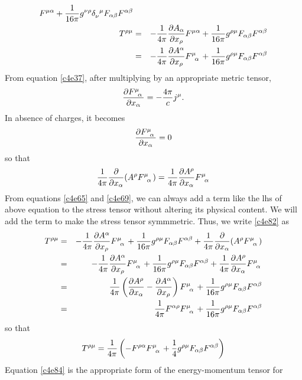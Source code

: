 \begin{enumerate}
\begin{eqnarray}
F^{\mu\alpha} +
\frac{1}{16\pi}g^{\nu\rho}\tensor{\delta}{_\nu^\mu} F_{\alpha\beta}
F^{\alpha\beta} \nonumber \\
T^{\rho\mu} &=& -\frac{1}{4\pi}\pdt{A_\alpha}{x_\rho}F^{\mu\alpha} + 
\frac{1}{16\pi}\tensor{g}{^\rho^\mu} F_{\alpha\beta}F^{\alpha\beta} \nonumber \\
 &=& -\frac{1}{4\pi}\pdt{A^\alpha}{x_\rho}\tensor{F}{^\mu_\alpha} + 
\frac{1}{16\pi}\tensor{g}{^\rho^\mu} F_{\alpha\beta}F^{\alpha\beta} 
\label{c4e82}
\end{eqnarray}
From equation \eqref{c4e37}, after multiplying by an appropriate metric tensor,
\[
\pdt{\tensor{F}{^\mu_\alpha}}{x_\alpha} = -\frac{4\pi}{c}j^\mu.
\]
In absence of charges, it becomes
\[
\pdt{\tensor{F}{^\mu_\alpha}}{x_\alpha} = 0
\]
so that
\begin{equation}\label{c4e83}
\frac{1}{4\pi}\frac{\partial}{\partial x_\alpha}(A^\rho\tensor{F}{^\mu_\alpha}) 
= \frac{1}{4\pi}\pdt{A^\rho}{x_\alpha}\tensor{F}{^\mu_\alpha}
\end{equation}
From equations \eqref{c4e65} and \eqref{c4e69}, we can always add a term like 
the lhs of above equation to the stress tensor without altering its physical 
content. We will add the term to make the stress tensor symmmetric. Thus, we 
write \eqref{c4e82} as
\begin{eqnarray*}
T^{\rho\mu} &=& -\frac{1}{4\pi}\pdt{A^\alpha}{x_\rho}\tensor{F}{^\mu_\alpha} + 
\frac{1}{16\pi}\tensor{g}{^\rho^\mu} F_{\alpha\beta}F^{\alpha\beta} +
\frac{1}{4\pi}\frac{\partial}{\partial x_\alpha}(A^\rho
\tensor{F}{^\mu_\alpha}) \\
 &=& -\frac{1}{4\pi}\pdt{A^\alpha}{x_\rho}\tensor{F}{^\mu_\alpha} + 
\frac{1}{16\pi}\tensor{g}{^\rho^\mu} F_{\alpha\beta}F^{\alpha\beta} +
\frac{1}{4\pi}\pdt{A^\rho}{x_\alpha}\tensor{F}{^\mu_\alpha} \\
 &=& \frac{1}{4\pi}\left(\pdt{A^\rho}{x_\alpha} - \pdt{A^\alpha}{x_\rho}\right)
 \tensor{F}{^\mu_\alpha} + 
 \frac{1}{16\pi}\tensor{g}{^\rho^\mu} F_{\alpha\beta}F^{\alpha\beta} \\
 &=& \frac{1}{4\pi}F^{\alpha\rho}\tensor{F}{^\mu_\alpha} +
  \frac{1}{16\pi}\tensor{g}{^\rho^\mu} F_{\alpha\beta}F^{\alpha\beta}
\end{eqnarray*}
so that
\begin{equation}\label{c4e84}
T^{\rho\mu} = \frac{1}{4\pi}\left(-F^{\rho\alpha}\tensor{F}{^\mu_\alpha} +
\frac{1}{4}g^{\rho\mu}F_{\alpha\beta}F^{\alpha\beta}\right)
\end{equation}
Equation \eqref{c4e84} is the appropriate form of the energy-momentum tensor for

\end{enumerate}
